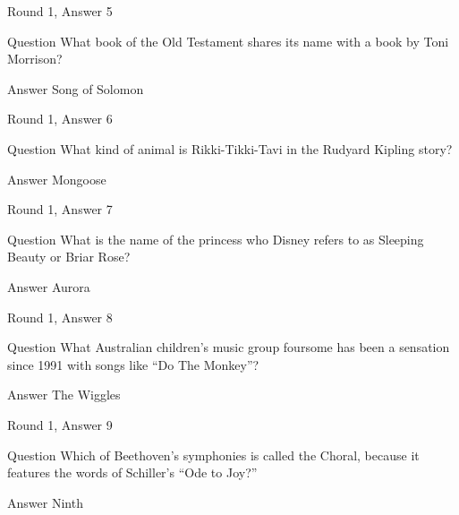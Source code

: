 \documentclass[11pt]{beamer}
\begin{document}
\begin{frame}[t]{Round 1, Answer 5}
\vspace{2em}
\begin{block}{Question}
What book of the Old Testament shares its name with a book by Toni Morrison\@?
\end{block}
\pause{}
\begin{block}{Answer}
Song of Solomon
\end{block}
\end{frame}
    

\begin{frame}[t]{Round 1, Answer 6}
\vspace{2em}
\begin{block}{Question}
What kind of animal is Rikki-Tikki-Tavi in the Rudyard Kipling story\@?
\end{block}
\pause{}
\begin{block}{Answer}
Mongoose
\end{block}
\end{frame}
    

\begin{frame}[t]{Round 1, Answer 7}
\vspace{2em}
\begin{block}{Question}
What is the name of the princess who Disney refers to as Sleeping Beauty or Briar Rose\@?
\end{block}
\pause{}
\begin{block}{Answer}
Aurora
\end{block}
\end{frame}
    

\begin{frame}[t]{Round 1, Answer 8}
\vspace{2em}
\begin{block}{Question}
What Australian children's music group foursome has been a sensation since 1991 with songs like ``Do The Monkey''\@?
\end{block}
\pause{}
\begin{block}{Answer}
The Wiggles
\end{block}
\end{frame}
    

\begin{frame}[t]{Round 1, Answer 9}
\vspace{2em}
\begin{block}{Question}
Which of Beethoven's symphonies is called the Choral, because it features the words of Schiller's ``Ode to Joy?''
\end{block}
\pause{}
\begin{block}{Answer}
Ninth
\end{block}
\end{frame}
    
\end{document}
